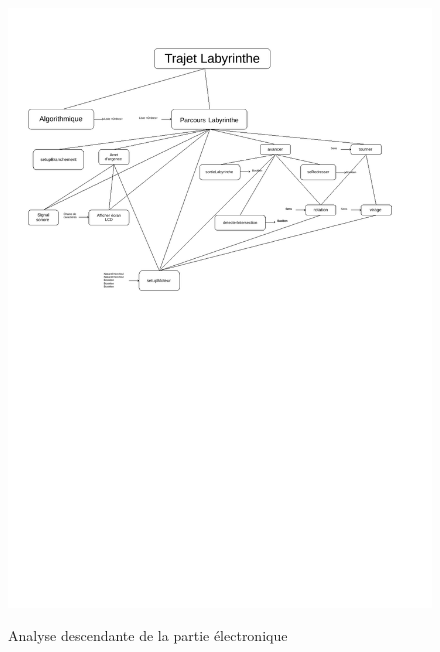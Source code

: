 \begin{figure}[htbp]
    \centering
    \caption{Analyse descendante de la partie électronique} 
    \includegraphics[width=1.2\textwidth]{elec/analyseDescendante_Elec.pdf}  
    \label{fig:analyse}
\end{figure}
